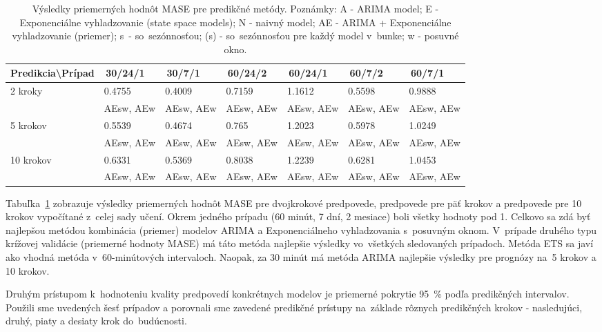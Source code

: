 \documentclass[thesismargins, thesislinespacing, openright, upjsfrontpage]{rnthesis}
\begin{document}
\begin{table}[h]
    \centering
    \footnotesize 
    \begin{tabular}{|p{3cm}|p{1.5cm}|p{1.5cm}|p{1.5cm}|p{1.5cm}|p{1.5cm}|p{1.5cm}|} \hline
        Predikcia\textbackslash Prípad & \,30/24/1\, & \,30/7/1\, & \,60/24/2\, & \,60/24/1\, & \,60/7/2\, & \,60/7/1\, \\    
        \hline\hline
       \multirow{2}{*}{2 kroky} & 0.4755 & 0.4009 & 0.7159 & 1.1612 & 0.5598 & 0.9888 \\
       & AEsw, AEw & AEsw, AEw & AEsw, AEw & AEsw, AEw & AEsw, AEw & AEsw, AEw  \\
        \hline
        \multirow{2}{*}{5 krokov} & 0.5539 & 0.4674 & 0.765 & 1.2023 & 0.5978 & 1.0249 \\
        & AEsw, AEw & AEsw, AEw & AEsw, AEw & AEsw, AEw & AEsw, AEw & AEsw, AEw  \\
        \hline
        \multirow{2}{*}{10 krokov} & 0.6331 & 0.5369 & 0.8038 & 1.2239 & 0.6281 & 1.0453 \\
        & AEsw, AEw & AEsw, AEw & AEsw, AEw & AEsw, AEw & AEsw, AEw & AEsw, AEw  \\
        \hline     
    \end{tabular}
    \caption{Výsledky priemerných hodnôt MASE pre predikčné metódy. Poznámky: A - ARIMA model; E - Exponenciálne vyhladzovanie (state space models); N - naivný model; AE - ARIMA + Exponenciálne vyhladzovanie (priemer); s~- so~sezónnosťou; (s) - so~sezónnosťou pre každý model v~bunke; w - posuvné okno.}
    \label{tab:mase}
\end{table}

Tabuľka~\ref{tab:mase} zobrazuje výsledky priemerných hodnôt MASE pre dvojkrokové predpovede, predpovede pre päť krokov a predpovede pre 10 krokov vypočítané z~celej sady učení. Okrem jedného prípadu (60 minút, 7 dní, 2 mesiace) boli všetky hodnoty pod 1. Celkovo sa zdá byť najlepšou metódou kombinácia (priemer) modelov ARIMA a Exponenciálneho vyhladzovania s~posuvným oknom. V~prípade druhého typu krížovej validácie (priemerné hodnoty MASE) má táto metóda najlepšie výsledky vo~všetkých sledovaných prípadoch. Metóda ETS sa javí ako vhodná metóda v~60-minútových intervaloch. Naopak, za 30 minút má metóda ARIMA najlepšie výsledky pre prognózy na~5 krokov a 10 krokov.


Druhým prístupom k~hodnoteniu kvality predpovedí konkrétnych modelov je priemerné pokrytie 95~\% podľa predikčných intervalov. Použili sme uvedených šesť prípadov a porovnali sme zavedené predikčné prístupy na~základe rôznych predikčných krokov - nasledujúci, druhý, piaty a desiaty krok do~budúcnosti.
\end{document}
